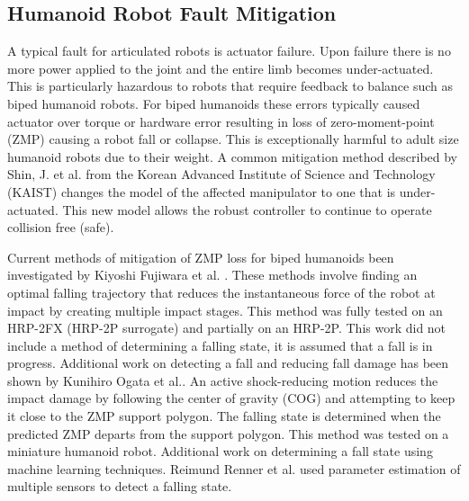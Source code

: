 \subsection{Humanoid Robot Fault Mitigation}
\label{sub:humanoidRobotFaultMitigation}
A typical fault for articulated robots is actuator failure.  Upon failure there
is no more power applied to the joint and the entire limb becomes under-actuated.
This is particularly hazardous to robots that require feedback to balance such as 
biped humanoid robots.  For biped humanoids these errors typically caused actuator 
over torque or hardware error resulting in loss of zero-moment-point
(ZMP) \cite{zmp35} causing a robot fall or collapse.  This is exceptionally
harmful to adult size humanoid robots due to their weight.  A common 
mitigation method described by Shin, J. et al.\cite{772398} from the Korean
Advanced Institute of Science and Technology (KAIST) changes the model of the
affected manipulator to one that is under-actuated.  This new model allows
the robust controller to continue to operate collision free (safe).

Current methods of mitigation of ZMP loss for biped humanoids been investigated
by Kiyoshi Fujiwara et al. \cite{4115653}.  These methods involve finding an
optimal falling trajectory that reduces the instantaneous force of the robot at
impact by creating multiple impact stages\cite{4399327}.  This method was fully
tested on an HRP-2FX (HRP-2P surrogate) and partially on an HRP-2P.  This work
did not include a method of determining a falling state, it is assumed that a
fall is in progress.  Additional work on detecting a fall and reducing fall
damage has been shown by Kunihiro Ogata et al.\cite{4755950}.  An active
shock-reducing motion reduces the impact damage by following the center of
gravity (COG) and attempting to keep it close to the ZMP support polygon.  The
falling state is determined when the predicted ZMP departs from the support
polygon. This method was tested on a miniature humanoid robot.  Additional work
on determining a fall state using machine learning techniques\cite{4813885}.
Reimund Renner et al. used parameter estimation of multiple sensors to detect a
falling state\cite{4058847}.
